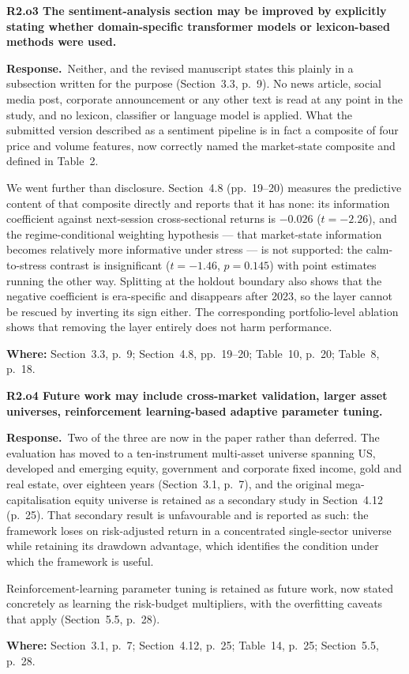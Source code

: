 \documentclass[11pt,a4paper]{article}
\newcommand{\rc}[1]{\par\medskip\noindent\textbf{#1}\par\nopagebreak}
\newcommand{\resp}{\par\noindent\textbf{Response.}\ }
\newcommand{\where}[1]{\par\smallskip\noindent\textcolor{blue!55!black}{\textbf{Where:} #1}\par}
\begin{document}
\rc{R2.o3 The sentiment-analysis section may be improved by explicitly stating whether
domain-specific transformer models or lexicon-based methods were used.}

\resp Neither, and the revised manuscript states this plainly in a subsection written
for the purpose (Section~3.3, p.~9). No news article, social media post, corporate
announcement or any other text is read at any point in the study, and no lexicon,
classifier or language model is applied. What the submitted version described as a
sentiment pipeline is in fact a composite of four price and volume features, now
correctly named the market-state composite and defined in Table~2.

We went further than disclosure. Section~4.8 (pp.~19--20) measures the predictive
content of that composite directly and reports that it has none: its information
coefficient against next-session cross-sectional returns is $-0.026$
($t = -2.26$), and the regime-conditional weighting hypothesis --- that market-state
information becomes relatively more informative under stress --- is not supported: the
calm-to-stress contrast is insignificant ($t = -1.46$, $p = 0.145$) with point estimates
running the other way. Splitting at the holdout boundary also shows that the negative
coefficient is era-specific and disappears after 2023, so the layer cannot be rescued by
inverting its sign either. The corresponding portfolio-level ablation shows that removing
the layer entirely does not harm performance.
\where{Section~3.3, p.~9; Section~4.8, pp.~19--20; Table~10, p.~20; Table~8, p.~18.}

\rc{R2.o4 Future work may include cross-market validation, larger asset universes,
reinforcement learning-based adaptive parameter tuning.}

\resp Two of the three are now in the paper rather than deferred. The evaluation has
moved to a ten-instrument multi-asset universe spanning US, developed and emerging
equity, government and corporate fixed income, gold and real estate, over eighteen years
(Section~3.1, p.~7), and the original mega-capitalisation equity universe is retained as
a secondary study in Section~4.12 (p.~25). That secondary result is unfavourable and is
reported as such: the framework loses on risk-adjusted return in a concentrated
single-sector universe while retaining its drawdown advantage, which identifies the
condition under which the framework is useful.

Reinforcement-learning parameter tuning is retained as future work, now stated concretely
as learning the risk-budget multipliers, with the overfitting caveats that apply
(Section~5.5, p.~28).
\where{Section~3.1, p.~7; Section~4.12, p.~25; Table~14, p.~25; Section~5.5, p.~28.}
\end{document}
